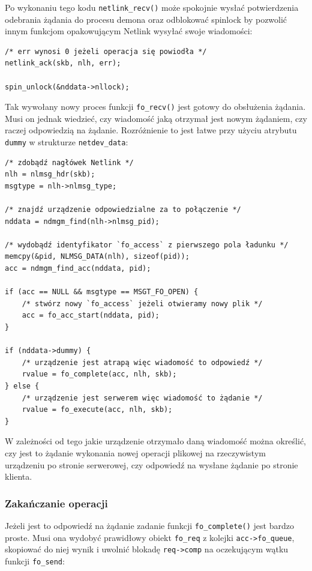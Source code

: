 \documentclass[11pt]{scrartcl}
\begin{document}
Po wykonaniu tego kodu \texttt{netlink\_recv()} może spokojnie wysłać potwierdzenia odebrania żądania do procesu demona oraz odblokować spinlock by pozwolić innym funkcjom opakowującym Netlink wysyłać swoje wiadomości:

\begin{verbatim}
/* err wynosi 0 jeżeli operacja się powiodła */
netlink_ack(skb, nlh, err);

spin_unlock(&nddata->nllock);
\end{verbatim}

Tak wywołany nowy proces funkcji \texttt{fo\_recv()} jest gotowy do obsłużenia żądania. Musi on jednak wiedzieć, czy wiadomość jaką otrzymał jest nowym żądaniem, czy raczej odpowiedzią na żądanie. Rozróżnienie to jest łatwe przy użyciu atrybutu \texttt{dummy} w strukturze \texttt{netdev\_data}:

\begin{verbatim}
/* zdobądź nagłówek Netlink */
nlh = nlmsg_hdr(skb);
msgtype = nlh->nlmsg_type;

/* znajdź urządzenie odpowiedzialne za to połączenie */
nddata = ndmgm_find(nlh->nlmsg_pid);

/* wydobądź identyfikator `fo_access` z pierwszego pola ładunku */
memcpy(&pid, NLMSG_DATA(nlh), sizeof(pid));
acc = ndmgm_find_acc(nddata, pid);

if (acc == NULL && msgtype == MSGT_FO_OPEN) {
    /* stwórz nowy `fo_access` jeżeli otwieramy nowy plik */
    acc = fo_acc_start(nddata, pid);
}

if (nddata->dummy) {
    /* urządzenie jest atrapą więc wiadomość to odpowiedź */
    rvalue = fo_complete(acc, nlh, skb);
} else {
    /* urządzenie jest serwerem więc wiadomość to żądanie */
    rvalue = fo_execute(acc, nlh, skb);
}
\end{verbatim}

W zależności od tego jakie urządzenie otrzymało daną wiadomość można określić, czy jest to żądanie wykonania nowej operacji plikowej na rzeczywistym urządzeniu po stronie serwerowej, czy odpowiedź na wysłane żądanie po stronie klienta.

\subsubsection{Zakańczanie operacji}

Jeżeli jest to odpowiedź na żądanie zadanie funkcji \texttt{fo\_complete()} jest bardzo proste. Musi ona wydobyć prawidłowy obiekt \texttt{fo\_req} z kolejki \texttt{acc-\textgreater{}fo\_queue}, skopiować do niej wynik i uwolnić blokadę \texttt{req-\textgreater{}comp} na oczekującym wątku funkcji \texttt{fo\_send}:
\end{document}
